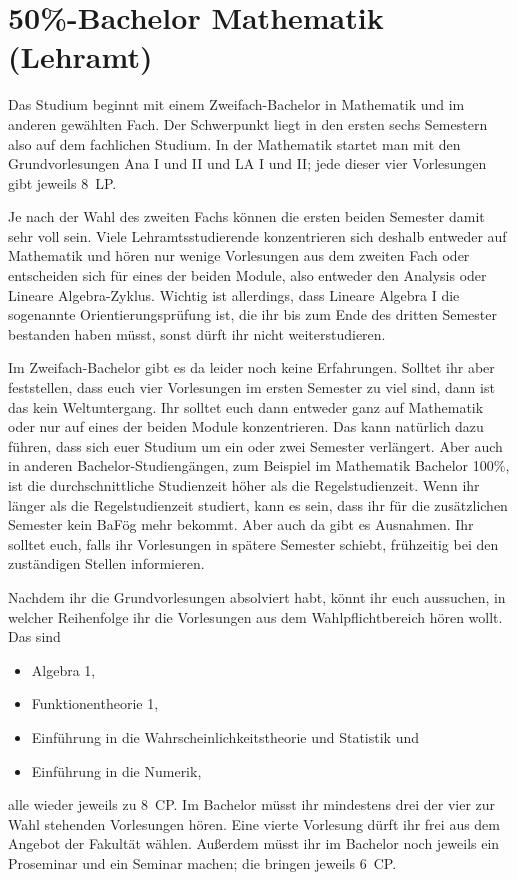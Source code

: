 \section{50\%-Bachelor Mathematik (Lehramt)}

Das Studium beginnt mit einem Zweifach-Bachelor in Mathematik und im anderen
gewählten Fach. Der Schwerpunkt liegt in den ersten sechs Semestern also auf
dem fachlichen Studium. In der Mathematik startet man mit den Grundvorlesungen
Ana I und II und LA I und II; jede dieser vier Vorlesungen gibt jeweils 8~LP.

Je nach der Wahl des zweiten Fachs können die ersten beiden Semester damit sehr
voll sein. Viele Lehramtsstudierende konzentrieren sich deshalb entweder auf
Mathematik und hören nur wenige Vorlesungen aus dem zweiten Fach oder
entscheiden sich für eines der beiden Module, also entweder den Analysis oder
Lineare Algebra-Zyklus. Wichtig ist allerdings, dass Lineare Algebra I die
sogenannte Orientierungsprüfung ist, die ihr bis zum Ende des dritten Semester
bestanden haben müsst, sonst dürft ihr nicht weiterstudieren.

Im Zweifach-Bachelor gibt es da leider noch keine Erfahrungen. Solltet ihr
aber feststellen, dass euch vier Vorlesungen im ersten Semester zu viel sind,
dann ist das kein Weltuntergang. Ihr solltet euch dann entweder ganz auf
Mathematik oder nur auf eines der beiden Module konzentrieren. Das kann
natürlich dazu führen, dass sich euer Studium um ein oder zwei Semester
verlängert. Aber auch in anderen Bachelor-Studiengängen, zum Beispiel im
Mathematik Bachelor 100\%, ist die durchschnittliche Studienzeit höher als die
Regelstudienzeit.  Wenn ihr länger als die Regelstudienzeit studiert, kann es
sein, dass ihr für die zusätzlichen Semester kein BaFög mehr bekommt. Aber auch
da gibt es Ausnahmen.  Ihr solltet euch, falls ihr Vorlesungen in spätere
Semester schiebt, frühzeitig bei den zuständigen Stellen informieren.

Nachdem ihr die Grundvorlesungen absolviert habt, könnt ihr euch aussuchen, in
welcher Reihenfolge ihr die Vorlesungen aus dem Wahlpflichtbereich hören
wollt. Das sind
\begin{itemize}
  \item Algebra 1,
  \item Funktionentheorie 1,
  \item Einführung in die Wahrscheinlichkeitstheorie und Statistik und
  \item Einführung in die Numerik,
\end{itemize}
alle wieder jeweils zu 8~CP. Im Bachelor müsst ihr mindestens drei der vier zur
Wahl stehenden Vorlesungen hören. Eine vierte Vorlesung  dürft ihr frei aus dem
Angebot der Fakultät wählen. Außerdem müsst ihr im Bachelor noch jeweils ein
Proseminar und ein Seminar machen; die bringen jeweils 6~CP.

